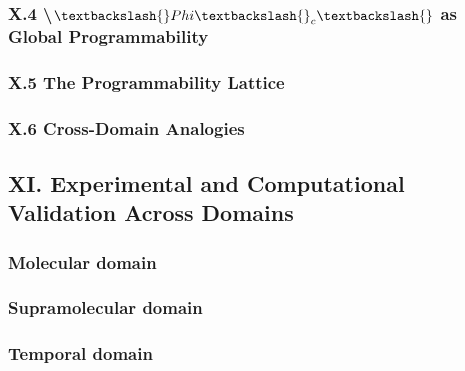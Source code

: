 \documentclass{article[11pt,letterpaper]}
\begin{document}
\subsubsection{X.4 \textbackslash{}$\textbackslash{}Phi\textbackslash{}_c\textbackslash{}$ as Global Programmability}
\label{sec:x4-phic-as-global-programmability}


\subsubsection{X.5 The Programmability Lattice}
\label{sec:x5-the-programmability-lattice}


\subsubsection{X.6 Cross-Domain Analogies}
\label{sec:x6-cross-domain-analogies}


\subsection{XI. Experimental and Computational Validation Across Domains}
\label{sec:xi-experimental-and-computational-validation-acros}


\subsubsection{Molecular domain}
\label{sec:molecular-domain}


\subsubsection{Supramolecular domain}
\label{sec:supramolecular-domain}


\subsubsection{Temporal domain}
\label{sec:temporal-domain}
\end{document}
